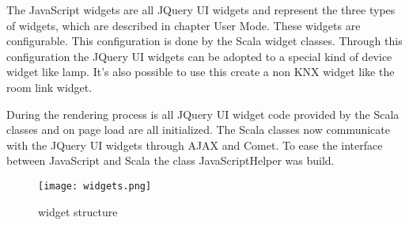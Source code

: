 The JavaScript widgets are all JQuery UI widgets and represent the three types of widgets, which are described in chapter User Mode. These widgets are configurable. This configuration is done by the Scala widget classes. Through this configuration the JQuery UI widgets can be adopted to a special kind of device widget like lamp. It's also possible to use this create a non KNX widget like the room link widget.

During the rendering process is all JQuery UI widget code provided by the Scala classes and on page load are all initialized. The Scala classes now communicate with the JQuery UI widgets through AJAX and Comet. To ease the interface between JavaScript and Scala the class JavaScriptHelper was build.
  \begin{figure}[h]
  \centering
  \texttt{[image: widgets.png]}
  \caption{widget structure}
  \label{fig:widgets}
  \end{figure}
